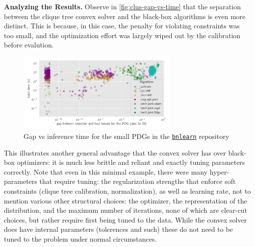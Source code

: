 \textbf{Analyzing the Results.}
Observe in \cref{fig:clus-gap-vs-time} that the separation between the clique tree convex solver and the black-box algorithms is even more distinct. This is because, in this case, the penalty for violating constraints was too small, and the optimization effort was largely wiped out by the calibration before evalution. 


\begin{figure}
    \centering
    \includegraphics[width=0.7\textwidth]{figs/bn/gap-v-time}
    \caption{Gap vs inference time for the small PDGs in the \href{https://www.bnlearn.com/bnrepository/}{\texttt{bnlearn}} repository}
    \label{fig:bn-gap-v-time}
\end{figure}

This illustrates another general advantage that the convex solver has over black-box optimizers: it is much less brittle and reliant and exactly tuning parameters correctly. Note that even in this minimal example, there were many hyper-parameters that require tuning:
the regularization strengths that enforce soft constraints (clique tree calibration, normalization), as well as learning rate, not to mention
various other structural choices: the optimizer, the representation of the distribution, and the maximum number of iterations, none of which are clear-cut choices, but rather require first being tuned to the data.
While the convex solver does have internal parameters (tolerences and such) these do not need to be tuned to the problem under normal circumstances.

